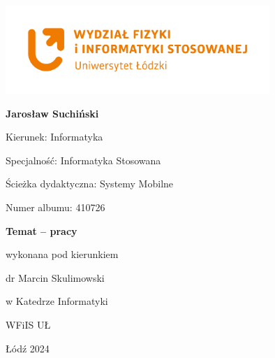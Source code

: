 \begin{titlepage}

\begin{center}

\includegraphics[width=0.75\textwidth]{images/faculty/color.png}

\vspace{2cm}

{\fontsize{22pt}{28pt}\bf\selectfont 
Jarosław Suchiński
}

\vspace{1cm}

\end{center}

{\fontsize{13pt}{16pt}\selectfont 
Kierunek: Informatyka

Specjalność: Informatyka Stosowana

Ścieżka dydaktyczna: Systemy Mobilne

Numer albumu: 410726
}

\vspace{1cm}

\begin{center}

{\fontsize{20pt}{26pt}\bf\selectfont Temat – pracy}
\vspace{2cm}

\end{center}

{\fontsize{13pt}{16pt}\selectfont 
    \hspace{7.25cm}{\bf Praca magisterska}
    
    \hspace{7.75cm}wykonana pod kierunkiem
    
    \hspace{7.75cm}dr Marcin Skulimowski
    
    \hspace{7.75cm}w Katedrze Informatyki
    
    \hspace{7.75cm}WFiIS UŁ
}
\vspace{2cm}

\begin{center}

Łódź 2024

\end{center}

\end{titlepage}